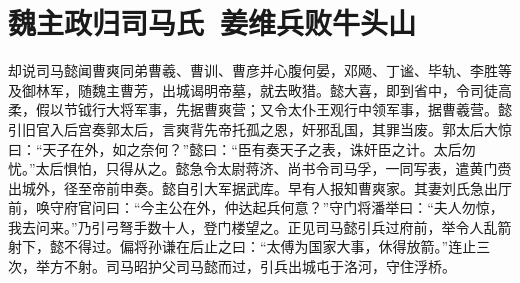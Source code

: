 \chapter{魏主政归司马氏~姜维兵败牛头山}

却说司马懿闻曹爽同弟曹羲、曹训、曹彦并心腹何晏，邓飏、丁谧、毕轨、李胜等及御林军，随魏主曹芳，出城谒明帝墓，就去畋猎。懿大喜，即到省中，令司徒高柔，假以节钺行大将军事，先据曹爽营；又令太仆王观行中领军事，据曹羲营。懿引旧官入后宫奏郭太后，言爽背先帝托孤之恩，奸邪乱国，其罪当废。郭太后大惊曰：“天子在外，如之奈何？”懿曰：“臣有奏天子之表，诛奸臣之计。太后勿忧。”太后惧怕，只得从之。懿急令太尉蒋济、尚书令司马孚，一同写表，遣黄门赍出城外，径至帝前申奏。懿自引大军据武库。早有人报知曹爽家。其妻刘氏急出厅前，唤守府官问曰：“今主公在外，仲达起兵何意？”守门将潘举曰：“夫人勿惊，我去问来。”乃引弓弩手数十人，登门楼望之。正见司马懿引兵过府前，举令人乱箭射下，懿不得过。偏将孙谦在后止之曰：“太傅为国家大事，休得放箭。”连止三次，举方不射。司马昭护父司马懿而过，引兵出城屯于洛河，守住浮桥。

